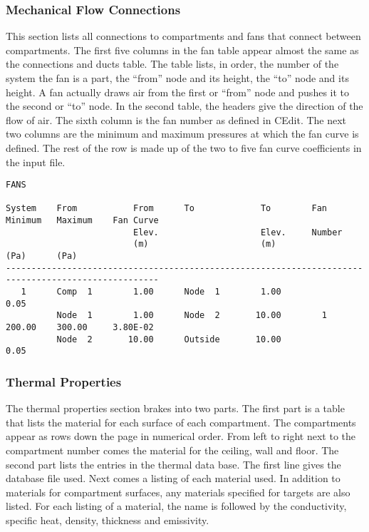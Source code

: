 \subsubsection{Mechanical Flow Connections}

This section lists all connections to compartments and fans that connect between compartments. The first five columns in the fan table appear almost the same as the connections and ducts table.  The table lists, in order, the number of the system the fan is a part, the ``from'' node and its height, the ``to'' node and its height.  A fan actually draws air from the first or ``from'' node and pushes it to the second or ``to'' node.  In the second table, the headers give the direction of the flow of air.  The sixth column is the fan number as defined in CEdit.  The next two columns are the minimum and maximum pressures at which the fan curve is defined.  The rest of the row is made up of the two to five fan curve coefficients in the input file.

\begin{lstlisting}[basicstyle=\scriptsize]
FANS

System    From           From      To             To        Fan       Minimum   Maximum    Fan Curve
                         Elev.                    Elev.     Number
                         (m)                      (m)                 (Pa)      (Pa)
----------------------------------------------------------------------------------------------------
   1      Comp  1        1.00      Node  1        1.00                0.05
          Node  1        1.00      Node  2       10.00        1       200.00    300.00     3.80E-02
          Node  2       10.00      Outside       10.00                0.05
\end{lstlisting}

\subsubsection{Thermal Properties}

The thermal properties section brakes into two parts.  The first part is a table that lists the material for each surface of each compartment.  The compartments appear as rows down the page in numerical order.  From left to right next to the compartment number comes the material for the ceiling, wall and floor.  The second part lists the entries in the thermal data base.  The first line gives the database file used.  Next comes a listing of each material used. In addition to materials for compartment surfaces, any materials specified for targets are also listed.  For each listing of a material, the name is followed by the conductivity, specific heat, density, thickness and emissivity.

